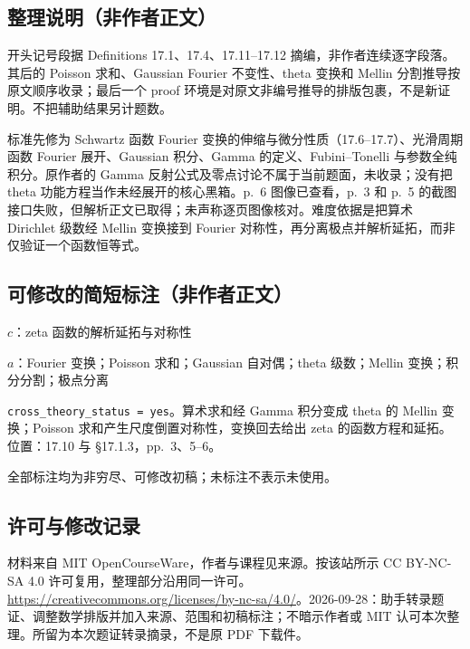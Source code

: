 \documentclass[UTF8,11pt]{ctexart}
\theoremstyle{definition}
\begin{document}
\subsection*{整理说明（非作者正文）}
开头记号段据 Definitions 17.1、17.4、17.11--17.12 摘编，非作者连续逐字段落。其后的 Poisson 求和、Gaussian Fourier 不变性、theta 变换和 Mellin 分割推导按原文顺序收录；最后一个 proof 环境是对原文非编号推导的排版包裹，不是新证明。不把辅助结果另计题数。

标准先修为 Schwartz 函数 Fourier 变换的伸缩与微分性质（17.6--17.7）、光滑周期函数 Fourier 展开、Gaussian 积分、Gamma 的定义、Fubini--Tonelli 与参数全纯积分。原作者的 Gamma 反射公式及零点讨论不属于当前题面，未收录；没有把 theta 功能方程当作未经展开的核心黑箱。p.~6 图像已查看，p.~3 和 p.~5 的截图接口失败，但解析正文已取得；未声称逐页图像核对。难度依据是把算术 Dirichlet 级数经 Mellin 变换接到 Fourier 对称性，再分离极点并解析延拓，而非仅验证一个函数恒等式。
\subsection*{可修改的简短标注（非作者正文）}
$c$：zeta 函数的解析延拓与对称性

$a$：Fourier 变换；Poisson 求和；Gaussian 自对偶；theta 级数；Mellin 变换；积分分割；极点分离

\texttt{cross\_theory\_status = yes}。算术求和经 Gamma 积分变成 theta 的 Mellin 变换；Poisson 求和产生尺度倒置对称性，变换回去给出 zeta 的函数方程和延拓。位置：17.10 与 \S17.1.3，pp.~3、5--6。

全部标注均为非穷尽、可修改初稿；未标注不表示未使用。
\subsection*{许可与修改记录}
材料来自 MIT OpenCourseWare，作者与课程见来源。按该站所示 CC BY-NC-SA 4.0 许可复用，整理部分沿用同一许可。\url{https://creativecommons.org/licenses/by-nc-sa/4.0/}。2026-09-28：助手转录题证、调整数学排版并加入来源、范围和初稿标注；不暗示作者或 MIT 认可本次整理。所留为本次题证转录摘录，不是原 PDF 下载件。
\end{document}
